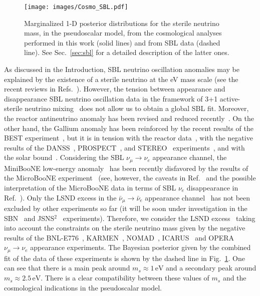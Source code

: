 \documentclass[a4paper,11pt]{article}
\begin{document}
 \begin{figure}[bh]
 \centering
 \texttt{[image: images/Cosmo\_SBL.pdf]}
 \caption{ Marginalized 1-D posterior distributions for the sterile neutrino mass, in the pseudoscalar model, from the cosmological analyses performed in this work (solid lines) and from SBL data (dashed line). See Sec.~\ref{sec:sbl} for a detailed description of the latter ones.}

\label{fig:sbl}
\end{figure}

As discussed in the Introduction,
SBL neutrino oscillation anomalies
may be explained by the existence of a sterile neutrino at the eV mass scale
(see the recent reviews in Refs.\ \cite{Gariazzo:2015rra,Boser:2019rta,Giunti:2019aiy}).
However,
the tension between appearance and disappearance 
SBL neutrino oscillation data
in the framework of 3+1 active-sterile neutrino mixing~\cite{Dentler:2018sju,Gariazzo:2017fdh,Diaz:2019fwt}
does not allow us to obtain a global SBL fit.
Moreover,
the reactor antineutrino anomaly has been revised and reduced recently~\cite{Berryman:2020agd,Giunti:2021kab}.
On the other hand,
the Gallium anomaly has been reinforced by the recent results of the BEST experiment~\cite{Barinov:2021asz},
but it is in tension with the reactor data~\cite{Giunti:2021kab},
with
the negative results of the
DANSS~\cite{Danilov:2020ucs},
PROSPECT~\cite{PROSPECT:2020sxr}, and
STEREO~\cite{STEREO:2019ztb}
experiments~\cite{Barinov:2021mjj},
and with the solar bound~\cite{Goldhagen:2021kxe,Giunti:2021kab,Berryman:2021yan}.
Considering the SBL $\nu_{\mu}\to\nu_{e}$ appearance channel,
the MiniBooNE low-energy anomaly~\cite{MiniBooNE:2018esg,MiniBooNE:2020pnu}
has been recently disfavored by the results of the MicroBooNE experiment~\cite{MicroBooNE:2021jwr,MicroBooNE:2021nxr,MicroBooNE:2021rmx}
(see, however, the caveats in Ref.~\cite{Arguelles:2021meu}
and the possible interpretation of the MicroBooNE data in terms of
SBL $\nu_e$ disappearance in Ref.~\cite{Denton:2021czb}).
Only the LSND excess in the $\bar\nu_{\mu}\to\bar\nu_{e}$ appearance channel~\cite{LSND:2001aii}
has not been excluded by other experiments so far
(it will be soon under investigation in the SBN~\cite{Machado:2019oxb} and JSNS$^2$~\cite{Rott:2018rlw} experiments).
Therefore, we consider the LSND excess~\cite{LSND:2001aii}
taking into account the constraints on the sterile neutrino mass
given by the negative results of the
BNL-E776~\cite{Borodovsky:1992pn},
KARMEN~\cite{KARMEN:2002zcm},
NOMAD~\cite{NOMAD:2003mqg},
ICARUS~\cite{ICARUS:2013cwr}
and
OPERA~\cite{OPERA:2013wvp}
$\nu_{\mu}\to\nu_{e}$ appearance experiments.
The Bayesian posterior given by the combined fit of the data of these experiments
is shown by the dashed line in Fig.~\ref{fig:sbl}.
One can see that there is a main peak around $m_s \approx 1 \, \text{eV}$
and a secondary peak around
$m_s \approx 2.5 \, \text{eV}$.
There is a clear compatibility between these values of $m_s$
and the cosmological indications in the pseudoscalar model.
\end{document}
